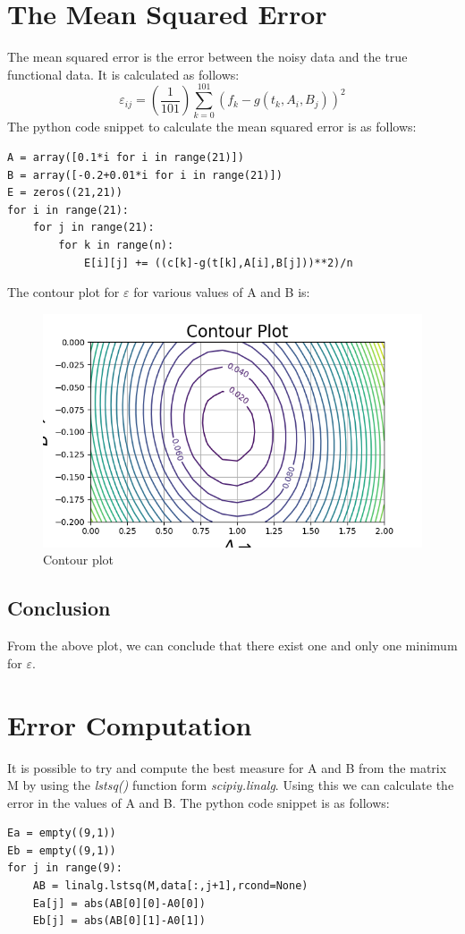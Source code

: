 \documentclass[11pt, a4paper]{article}
\begin{document}
\section{The Mean Squared Error}
The mean squared error is the error between the noisy data and the true functional data. It is calculated as follows:
$$\varepsilon_{ij} = (\frac{1}{101})\sum_{k=0}^{101}(f_{k} - g(t_{k},A_{i},B_{j}))^{2}$$
The python code snippet to calculate the mean squared error is as follows:
\begin{verbatim}	
A = array([0.1*i for i in range(21)])
B = array([-0.2+0.01*i for i in range(21)])
E = zeros((21,21))
for i in range(21):
    for j in range(21):
        for k in range(n):
            E[i][j] += ((c[k]-g(t[k],A[i],B[j]))**2)/n
\end{verbatim}
The contour plot for $\varepsilon$ for various values of A and B is:
	\begin{figure}[!tbh]
   	\centering
   	\includegraphics[scale=0.6]{Figure_2.png}   
   	\caption{Contour plot}
   	\label{fig:sample}
   \end{figure} 
     
\subsection*{Conclusion}
From the above plot, we can conclude that there exist one and only one minimum for $\varepsilon$.

\section{Error Computation} 
It is possible to try and compute the best measure for A and B from the matrix M by using the \textit{lstsq()} function form \textit{scipiy.linalg}.
Using this we can calculate the error in the values of A and B. The python code snippet is as follows:
\begin{verbatim}	
Ea = empty((9,1))
Eb = empty((9,1))
for j in range(9):	
    AB = linalg.lstsq(M,data[:,j+1],rcond=None)
    Ea[j] = abs(AB[0][0]-A0[0])
    Eb[j] = abs(AB[0][1]-A0[1])
\end{verbatim}
\end{document}
